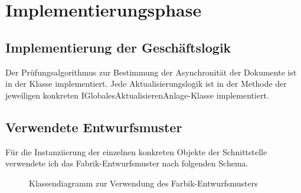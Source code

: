 \clearpage
\section{Implementierungsphase} 
\label{sec:Implementierungsphase}

\subsection{Implementierung der Geschäftslogik}
\label{sec:ImplementierungGeschaeftslogik}

Der Prüfungsalgorithmus zur Bestimmung der Asynchronität der Dokumente ist in der Klasse   implementiert.
Jede Aktualisierungslogik ist in der Methode  der jeweiligen konkreten I\-Glo\-ba\-les\-Ak\-tu\-a\-li\-sie\-ren\-An\-la\-ge-Klasse implementiert.

\subsection{Verwendete Entwurfsmuster}
\label{sec:Entwurfsmuster}

Für die Instanziierung der einzelnen konkreten Objekte der Schnittstelle  verwendete ich das Fabrik-Entwurfsmuster nach folgenden Schema.
\begin{figure}
	\centering
	\caption{Klassendiagramm zur Verwendung des Farbik-Entwurfsmusters}
\end{figure}


%



